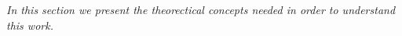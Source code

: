 
\label{cap:chapter2}

\textit{In this section we present the theorectical concepts needed in order to understand this work.}





%
%
\cleardoublepage
